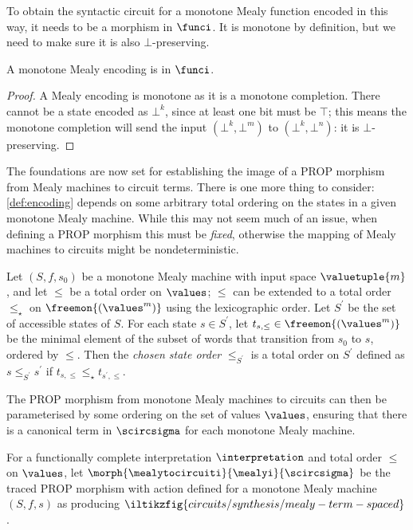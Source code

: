 To obtain the syntactic circuit for a monotone Mealy function encoded
in this way, it needs to be a morphism in \(\funci\).
It is monotone by definition, but we need to make sure it is also
\(\bot\)-preserving.

\begin{lemma}
    A monotone Mealy encoding is in \(\funci\).
\end{lemma}
\begin{proof}
    A Mealy encoding is monotone as it is a monotone completion.
    There cannot be a state encoded as \(\bot^k\), since at least one bit must
    be \(\top\); this means the monotone completion will send the input
    \((\bot^k, \bot^m)\) to \((\bot^k, \bot^n)\): it is
    \(\bot\)-preserving.
\end{proof}

The foundations are now set for establishing the image of a PROP morphism from
Mealy machines to circuit terms.
There is one more thing to consider: \cref{def:encoding} depends on some
arbitrary total ordering on the states in a given monotone Mealy machine.
While this may not seem much of an issue, when
defining a PROP morphism this must be \emph{fixed}, otherwise the mapping of
Mealy machines to circuits might be nondeterministic.

\begin{definition}
    Let \((S, f, s_0)\) be a monotone Mealy machine with input space
    \(\valuetuple{m}\), and let \(\leq\) be a total order on \(\values\);
    \(\leq\) can be extended to a total order \(\leq_\star\) on
    \(\freemon{(\values^m)}\) using the lexicographic order.
    Let \(S^\prime\) be the set of accessible states of \(S\).
    For each state \(s \in S^\prime\), let
    \(t_{s,\leq} \in \freemon{(\values^m)}\) be the minimal element of the
    subset of words that transition from \(s_0\) to \(s\), ordered by \(\leq\).
    Then the \emph{chosen state order} \(\leq_{S^\prime}\) is a total order on
    \(S^\prime\) defined as \(s \leq_{S^\prime} s^\prime\) if
    \(t_{s,\leq} \leq_\star t_{s^\prime,\leq}\).
\end{definition}

The PROP morphism from monotone Mealy machines to circuits can then be
parameterised by some ordering on the set of values \(\values\), ensuring that
there is a canonical term in \(\scircsigma\) for each monotone Mealy machine.

\begin{definition}\label{def:mealy-to-circuit}
    For a functionally complete interpretation \(\interpretation\) and total
    order \(\leq\) on \(\values\), let \(
    \morph{
        \mealytocircuiti
    }{
        \mealyi
    }{
        \scircsigma
    }
    \) be the traced PROP morphism with action defined for a monotone Mealy
    machine \((S,f,s)\) as producing \(
    \iltikzfig{circuits/synthesis/mealy-term-spaced}
    \).
\end{definition}

